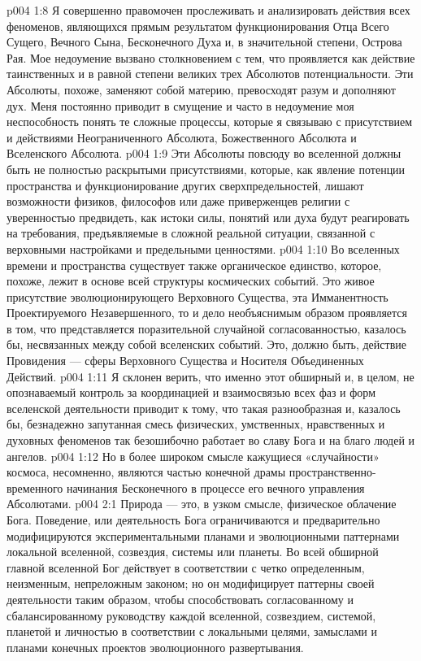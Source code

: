 \vs p004 1:8 Я совершенно правомочен прослеживать и анализировать действия всех феноменов, являющихся прямым результатом функционирования Отца Всего Сущего, Вечного Сына, Бесконечного Духа и, в значительной степени, Острова Рая. Мое недоумение вызвано столкновением с тем, что проявляется как действие таинственных и в равной степени великих трех Абсолютов потенциальности. Эти Абсолюты, похоже, заменяют собой материю, превосходят разум и дополняют дух. Меня постоянно приводит в смущение и часто в недоумение моя неспособность понять те сложные процессы, которые я связываю с присутствием и действиями Неограниченного Абсолюта, Божественного Абсолюта и Вселенского Абсолюта.
\vs p004 1:9 Эти Абсолюты повсюду во вселенной должны быть не полностью раскрытыми присутствиями, которые, как явление потенции пространства и функционирование других сверхпредельностей, лишают возможности физиков, философов или даже приверженцев религии с уверенностью предвидеть, как истоки силы, понятий или духа будут реагировать на требования, предъявляемые в сложной реальной ситуации, связанной с верховными настройками и предельными ценностями.
\vs p004 1:10 \pc Во вселенных времени и пространства существует также органическое единство, которое, похоже, лежит в основе всей структуры космических событий. Это живое присутствие эволюционирующего Верховного Существа, эта Имманентность Проектируемого Незавершенного, то и дело необъяснимым образом проявляется в том, что представляется поразительной случайной согласованностью, казалось бы, несвязанных между собой вселенских событий. Это, должно быть, действие Провидения --- сферы Верховного Существа и Носителя Объединенных Действий.
\vs p004 1:11 Я склонен верить, что именно этот обширный и, в целом, не опознаваемый контроль за координацией и взаимосвязью всех фаз и форм вселенской деятельности приводит к тому, что такая разнообразная и, казалось бы, безнадежно запутанная смесь физических, умственных, нравственных и духовных феноменов так безошибочно работает во славу Бога и на благо людей и ангелов.
\vs p004 1:12 Но в более широком смысле кажущиеся «случайности» космоса, несомненно, являются частью конечной драмы пространственно\hyp{}временного начинания Бесконечного в процессе его вечного управления Абсолютами.
\vs p004 2:1 Природа --- это, в узком смысле, физическое облачение Бога. Поведение, или деятельность Бога ограничиваются и предварительно модифицируются экспериментальными планами и эволюционными паттернами локальной вселенной, созвездия, системы или планеты. Во всей обширной главной вселенной Бог действует в соответствии с четко определенным, неизменным, непреложным законом; но он модифицирует паттерны своей деятельности таким образом, чтобы способствовать согласованному и сбалансированному руководству каждой вселенной, созвездием, системой, планетой и личностью в соответствии с локальными целями, замыслами и планами конечных проектов эволюционного развертывания.
